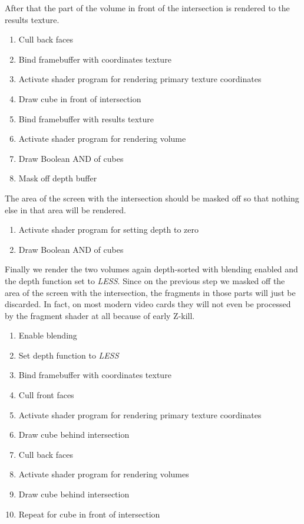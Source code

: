 \documentclass{report}
\begin{document}
After that the part of the volume in front of the intersection is rendered to
the results texture.

\begin{enumerate}
  \item Cull back faces
  \item Bind framebuffer with coordinates texture
  \item Activate shader program for rendering primary texture coordinates
  \item Draw cube in front of intersection
  \item Bind framebuffer with results texture
  \item Activate shader program for rendering volume
  \item Draw Boolean AND of cubes
  \item Mask off depth buffer
\end{enumerate}

The area of the screen with the intersection should be masked off so that
nothing else in that area will be rendered.

\begin{enumerate}
  \item Activate shader program for setting depth to zero
  \item Draw Boolean AND of cubes
\end{enumerate}

Finally we render the two volumes again depth-sorted with blending enabled and
the depth function set to \emph{LESS}.  Since on the previous step we masked off
the area of the screen with the intersection, the fragments in those parts will
just be discarded.  In fact, on most modern video cards they will not even be
processed by the fragment shader at all because of early Z-kill.

\begin{enumerate}
  \item Enable blending
  \item Set depth function to \emph{LESS}
  \item Bind framebuffer with coordinates texture
  \item Cull front faces
  \item Activate shader program for rendering primary texture coordinates
  \item Draw cube behind intersection
  \item Cull back faces
  \item Activate shader program for rendering volumes
  \item Draw cube behind intersection
  \item Repeat for cube in front of intersection
\end{enumerate}
\end{document}
